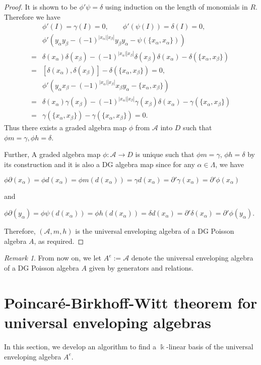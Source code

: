 \documentclass[a4paper,10pt]{amsart}
\theoremstyle{definition}
\theoremstyle{remark}
\newtheorem{remark}[theorem]{Remark}
\numberwithin{equation}{section}
\begin{document}
\begin{proof}
It is shown to be $\phi'\psi=\delta$ using induction on the
length of monomials in $R$. Therefore we have
\begin{align*}
&\phi'(I)=\gamma(I)=0, \quad \quad \phi'(\psi(I))=\delta(I)=0,\\
&\phi'(y_{\alpha}y_{\beta}-(-1)^{|x_{\alpha}||x_{\beta}|}y_{\beta}y_{\alpha}-\psi(\{x_{\alpha},
x_{\alpha}\}))\\
=&\delta(x_{\alpha})\delta(x_{\beta})-(-1)^{|x_{\alpha}||x_{\beta}|}\delta(x_{\beta})\delta(x_{\alpha})-\delta(\{x_{\alpha},x_{\beta}\})\\
=&[\delta(x_{\alpha}),\delta(x_{\beta})]-\delta(\{x_{\alpha}, x_{\beta}\})=0,\\
&\phi'(y_{\alpha}x_{\beta}-(-1)^{|x_{\alpha}||x_{\beta}|}x_{\beta}y_{\alpha}-\{x_{\alpha},
x_{\beta}\})\\
=&\delta(x_{\alpha})\gamma(x_{\beta})-(-1)^{|x_{\alpha}||x_{\beta}|}\gamma(x_{\beta})\delta(x_{\alpha})-\gamma(\{x_{\alpha},x_{\beta}\})\\
=&\gamma(\{x_{\alpha}, x_{\beta}\})-\gamma(\{x_{\alpha},
x_{\beta}\})=0.
\end{align*}
Thus there exists a graded algebra map $\phi$ from $\mathcal{A}$ into $D$
such that $\phi m=\gamma, \phi h=\delta$.

Further, A graded algebra map $\phi: \mathcal{A}\rightarrow D$ is unique
such that $\phi m=\gamma$, $\phi h=\delta$ by its construction and
it is also a DG algebra map since for any $\alpha\in \Lambda$, we
have
\begin{center}
$\phi\partial(x_{\alpha})=\phi d(x_{\alpha})=\phi
m(d(x_{\alpha}))=\gamma d(x_{\alpha})
=\partial'\gamma(x_{\alpha})=\partial'\phi(x_{\alpha})$
\end{center}
and
\begin{center}
$\phi\partial(y_{\alpha})=\phi\psi(d(x_{\alpha}))=\phi
h(d(x_{\alpha}))=\delta d(x_{\alpha})
=\partial'\delta(x_{\alpha})=\partial'\phi(y_{\alpha})$.
\end{center}
Therefore, $(\mathcal{A}, m, h)$ is the universal enveloping algebra of
a DG Poisson algebra $A$, as required.
\end{proof}

\begin{remark}
From now on, we let $A^e:=\mathcal{A}$ denote the universal enveloping
algebra of a DG Poisson algebra $A$ given by generators and
relations.
\end{remark}

\medskip
\section{Poincar\'{e}-Birkhoff-Witt theorem for universal
enveloping algebras} In this section, we develop an algorithm to
find a $\Bbbk$-linear basis of the universal enveloping algebra
$A^e$.
\end{document}
